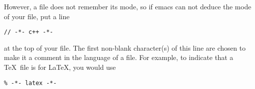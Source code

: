However, a file does not remember its mode, so if emacs can not deduce
the mode of your file, put a line
\begin{verbatim}
// -*- c++ -*-
\end{verbatim}
at the top of your file. The first non-blank character(s) of this line
are chosen to make it a comment in the language of a file. For
example, to indicate that a \TeX\ file is for \LaTeX, you would use
\begin{verbatim}
% -*- latex -*-
\end{verbatim}
